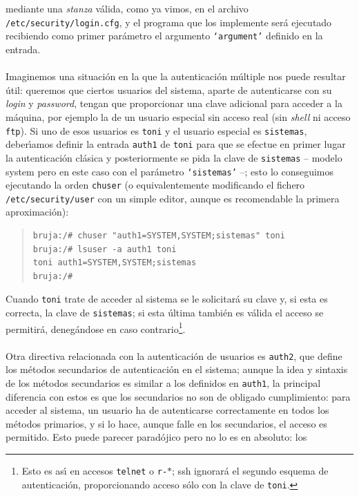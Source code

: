 mediante una {\it stanza} v\'alida, como ya vimos, en el archivo {\tt 
/etc/security/login.cfg}, y el programa que los implemente ser\'a ejecutado
recibiendo como primer par\'ametro el argumento {\tt `argument'} definido en la
entrada.\\
\\Imaginemos una situaci\'on en la que la autenticaci\'on m\'ultiple nos puede
resultar \'util: queremos que ciertos usuarios del sistema, aparte de 
autenticarse con su {\it login} y {\it password}, tengan que proporcionar una
clave adicional para acceder a la m\'aquina, por ejemplo la de un usuario 
especial
sin acceso real (sin {\it shell} ni acceso {\tt ftp}). Si uno de esos usuarios
es {\tt toni} y el usuario especial es {\tt sistemas}, deber\'{\i}amos definir 
la entrada {\tt auth1} de {\tt toni} para que se efectue en primer lugar la
autenticaci\'on cl\'asica y posteriormente se pida la clave de {\tt sistemas}
-- modelo {\sc system} pero en este caso con el par\'ametro {\tt `sistemas'} 
--; esto lo conseguimos ejecutando la orden {\tt chuser} (o equivalentemente
modificando el fichero {\tt /etc/security/user} con un simple editor, aunque es 
recomendable la primera aproximaci\'on):
\begin{quote}
\begin{verbatim}
bruja:/# chuser "auth1=SYSTEM,SYSTEM;sistemas" toni
bruja:/# lsuser -a auth1 toni
toni auth1=SYSTEM,SYSTEM;sistemas
bruja:/# 
\end{verbatim}
\end{quote}
Cuando {\tt toni} trate de acceder al sistema se le solicitar\'a su clave y, si
esta es correcta, la clave de {\tt sistemas}; si esta \'ultima tambi\'en es
v\'alida el acceso se permitir\'a, deneg\'andose en caso contrario\footnote{Esto
es as\'{\i} en accesos {\tt telnet} o {\tt r-$\ast$}; {\sc ssh} ignorar\'a el
segundo esquema de autenticaci\'on, proporcionando acceso s\'olo con la clave
de {\tt toni}.}.\\
\\Otra directiva relacionada con la autenticaci\'on de usuarios es {\tt auth2}, 
que define los m\'etodos secundarios de autenticaci\'on en el sistema; aunque
la idea y sintaxis de los m\'etodos secundarios es similar a los definidos en 
{\tt auth1}, la principal diferencia con estos es que los secundarios no son de 
obligado cumplimiento: para acceder al
sistema, un usuario ha de autenticarse correctamente en todos los m\'etodos
primarios, y si lo hace, aunque falle en los secundarios, el acceso es 
permitido. Esto puede parecer parad\'ojico pero no lo es en absoluto: los 
